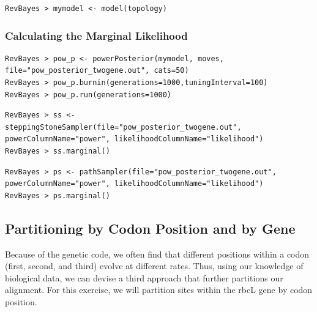 \documentclass[11pt]{article}
\begin{document}
{\tt \begin{snugshade*}
\begin{lstlisting}
RevBayes > mymodel <- model(topology)
\end{lstlisting}
\end{snugshade*}}

\subsubsection*{Calculating the Marginal Likelihood}

{\tt \begin{snugshade*}
\begin{lstlisting}
RevBayes > pow_p <- powerPosterior(mymodel, moves, file="pow_posterior_twogene.out", cats=50) 
RevBayes > pow_p.burnin(generations=1000,tuningInterval=100)
RevBayes > pow_p.run(generations=1000)  
\end{lstlisting}
\end{snugshade*}}

{\tt \begin{snugshade*}
\begin{lstlisting}
RevBayes > ss <- steppingStoneSampler(file="pow_posterior_twogene.out", powerColumnName="power", likelihoodColumnName="likelihood")
RevBayes > ss.marginal() 
\end{lstlisting}
\end{snugshade*}}

{\tt \begin{snugshade*}
\begin{lstlisting}
RevBayes > ps <- pathSampler(file="pow_posterior_twogene.out", powerColumnName="power", likelihoodColumnName="likelihood")
RevBayes > ps.marginal() 
\end{lstlisting}
\end{snugshade*}}




\bigskip
\subsection{Partitioning by Codon Position and by Gene}\label{secExtremeP}

Because of the genetic code, we often find that different positions within a codon (first, second, and third) evolve at different rates.
Thus, using our knowledge of biological data, we can devise a third approach that further partitions our alignment. 
For this exercise, we will partition sites within the rbcL gene by codon position.
\end{document}
